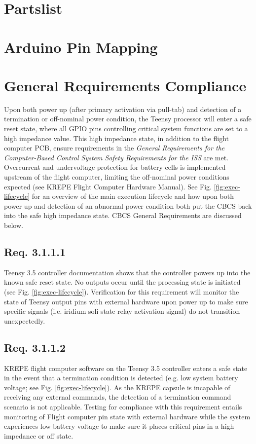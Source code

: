 \documentclass{article}
\begin{document}
\section{Partslist}
\label{app:partslist}


\newpage
\section{Arduino Pin Mapping}
\label{app:pinmap}



\iffalse
\newpage
\section{General Requirements Compliance}
Upon both power up (after primary activation via pull-tab) and detection of a termination or off-nominal power condition, the Teensy processor will enter a safe reset state, where all GPIO pins controlling critical system functions are set to a high impedance value. This high impedance state, in addition to the flight computer PCB, ensure requirements in the \textit{General Requirements for the Computer-Based Control System Safety Requirements for the ISS} are met. Overcurrent and undervoltage protection for battery cells is implemented upstream of the flight computer, limiting the off-nominal power conditions expected (see KREPE Flight Computer Hardware Manual). See Fig. \ref{fig:exec-lifecycle} for an overview of the main execution lifecycle and how upon both power up and detection of an abnormal power condition both put the CBCS back into the safe high impedance state. CBCS General Requirements are discussed below.

\subsection{Req. 3.1.1.1}
Teensy 3.5 controller documentation shows that the controller powers up into the known safe reset state. No outputs occur until the processing state is initiated (see Fig. \ref{fig:exec-lifecycle}). Verification for this requirement will monitor the state of Teensy output pins with external hardware upon power up to make sure specific signals (i.e. iridium soli state relay activation signal) do not transition unexpectedly. 

\subsection{Req. 3.1.1.2}
KREPE flight computer software on the Teensy 3.5 controller enters a safe state in the event that a termination condition is detected (e.g. low system battery  voltage; see Fig. \ref{fig:exec-lifecycle}). As the KREPE capsule is incapable of receiving any external commands, the detection of a termination command scenario is not applicable. Testing for compliance with this requirement entails monitoring of Flight computer pin state with external hardware while the system experiences low battery voltage to make sure it places critical pins in a high impedance or off state.
\end{document}
